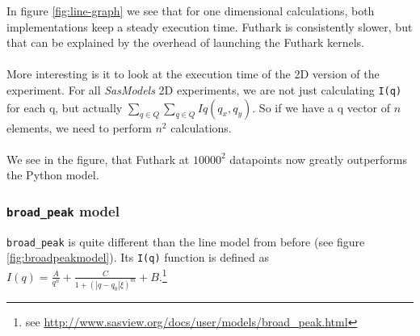 \documentclass[11pt]{article}
\newcommand{\sasmodels}{\textit{SasModels}}
\newcommand{\iq}{\texttt{I(q)}}
\begin{document}
In figure \ref{fig:line-graph} we see that for one dimensional calculations,
both implementations keep a steady execution time. Futhark is consistently 
slower, but that can be explained by the overhead of launching the Futhark kernels.
\\\\
More interesting is it to look at the execution time of the 2D version of the 
experiment. For all \sasmodels{} 2D experiments, we are not just calculating \iq
for each q, but actually $\sum_{q \in Q} \sum_{q \in Q} Iq(q_x, q_y)$.
So if we have a q vector of $n$ elements, we need to perform $n^2$ calculations.
\\\\
We see in the figure, that Futhark at $10000^2$ datapoints now greatly outperforms
the Python model.

\subsubsection{\texttt{broad\_peak} model}
\texttt{broad\_peak} is quite different than the line model from before (see
figure \ref{fig:broadpeakmodel}). Its \iq
function is defined as 
$I(q) = \frac{A}{q^n} + \frac{C}{1 + (|q - q_0|\xi)^m} + B$.\footnote{see \url{http://www.sasview.org/docs/user/models/broad_peak.html}}
\end{document}
